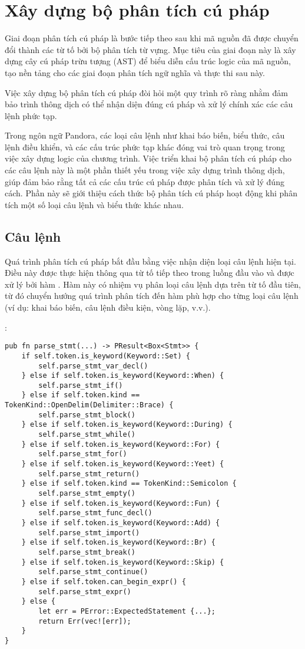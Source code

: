 \section{Xây dựng bộ phân tích cú pháp}
\label{ch3:syntax-analysis}
Giai đoạn phân tích cú pháp là bước tiếp theo sau khi mã nguồn đã được chuyển đổi thành các từ tố bởi bộ phân tích từ vựng. Mục tiêu của giai đoạn này là xây dựng cây cú pháp trừu tượng (AST) để biểu diễn cấu trúc logic của mã nguồn, tạo nền tảng cho các giai đoạn phân tích ngữ nghĩa và thực thi sau này. 

    Việc xây dựng bộ phân tích cú pháp đòi hỏi một quy trình rõ ràng nhằm đảm bảo trình thông dịch có thể nhận diện đúng cú pháp và xử lý chính xác các câu lệnh phức tạp.

Trong ngôn ngữ Pandora, các loại câu lệnh như khai báo biến, biểu thức, câu lệnh điều khiển, và các cấu trúc phức tạp khác đóng vai trò quan trọng trong việc xây dựng logic của chương trình. Việc triển khai bộ phân tích cú pháp cho các câu lệnh này là một phần thiết yếu trong việc xây dựng trình thông dịch, giúp đảm bảo rằng tất cả các cấu trúc cú pháp được phân tích và xử lý đúng cách. Phần này sẽ giới thiệu cách thức bộ phân tích cú pháp hoạt động khi phân tích một số loại câu lệnh và biểu thức khác nhau.

\subsection{Câu lệnh}
    Quá trình phân tích cú pháp bắt đầu bằng việc nhận diện loại câu lệnh hiện tại. Điều này được thực hiện thông qua từ tố tiếp theo trong luồng đầu vào và được xử lý bởi hàm . Hàm này có nhiệm vụ phân loại câu lệnh dựa trên từ tố đầu tiên, từ đó chuyển hướng quá trình phân tích đến hàm phù hợp cho từng loại câu lệnh (ví dụ: khai báo biến, câu lệnh điều kiện, vòng lặp, v.v.).

\noindent {}:
\begin{lstlisting}[]
pub fn parse_stmt(...) -> PResult<Box<Stmt>> {
    if self.token.is_keyword(Keyword::Set) {
        self.parse_stmt_var_decl()
    } else if self.token.is_keyword(Keyword::When) {
        self.parse_stmt_if()
    } else if self.token.kind == TokenKind::OpenDelim(Delimiter::Brace) {
        self.parse_stmt_block()
    } else if self.token.is_keyword(Keyword::During) {
        self.parse_stmt_while()
    } else if self.token.is_keyword(Keyword::For) {
        self.parse_stmt_for()
    } else if self.token.is_keyword(Keyword::Yeet) {
        self.parse_stmt_return()
    } else if self.token.kind == TokenKind::Semicolon {
        self.parse_stmt_empty()
    } else if self.token.is_keyword(Keyword::Fun) {
        self.parse_stmt_func_decl()
    } else if self.token.is_keyword(Keyword::Add) {
        self.parse_stmt_import()
    } else if self.token.is_keyword(Keyword::Br) {
        self.parse_stmt_break()
    } else if self.token.is_keyword(Keyword::Skip) {
        self.parse_stmt_continue()
    } else if self.token.can_begin_expr() {
        self.parse_stmt_expr()
    } else {
        let err = PError::ExpectedStatement {...};
        return Err(vec![err]);
    }
}
\end{lstlisting}

